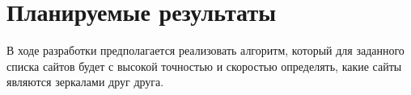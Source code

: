 \section{Планируемые результаты}
В ходе разработки предполагается реализовать алгоритм, который для заданного списка сайтов будет с высокой точностью и скоростью определять,
какие сайты являются зеркалами друг друга.